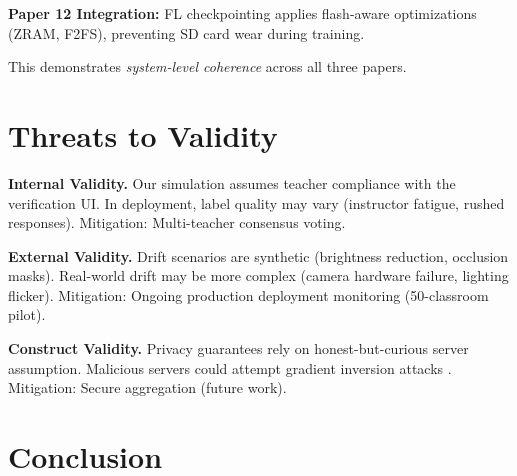 \documentclass[conference]{IEEEtran}
\begin{document}
\textbf{Paper 12 Integration:} FL checkpointing applies flash-aware optimizations (ZRAM, F2FS), preventing SD card wear during training.

This demonstrates \textit{system-level coherence} across all three papers.

\section{Threats to Validity}

\textbf{Internal Validity.} Our simulation assumes teacher compliance with the verification UI. In deployment, label quality may vary (instructor fatigue, rushed responses). Mitigation: Multi-teacher consensus voting.

\textbf{External Validity.} Drift scenarios are synthetic (brightness reduction, occlusion masks). Real-world drift may be more complex (camera hardware failure, lighting flicker). Mitigation: Ongoing production deployment monitoring (50-classroom pilot).

\textbf{Construct Validity.} Privacy guarantees rely on honest-but-curious server assumption. Malicious servers could attempt gradient inversion attacks \cite{zhu2019}. Mitigation: Secure aggregation \cite{bonawitz2017} (future work).

\section{Conclusion}
\end{document}
